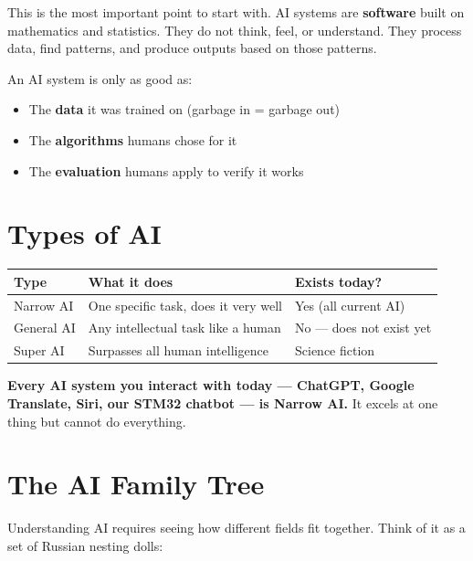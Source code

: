 \documentclass[11pt,a4paper]{report}
\begin{document}
This is the most important point to start with. AI systems are \textbf{software} built on mathematics and statistics. They do not think, feel, or understand. They process data, find patterns, and produce outputs based on those patterns.

An AI system is only as good as:
\begin{itemize}
    \item The \textbf{data} it was trained on (garbage in = garbage out)
    \item The \textbf{algorithms} humans chose for it
    \item The \textbf{evaluation} humans apply to verify it works
\end{itemize}

\section{Types of AI}

\begin{table}[h]
\centering
\begin{tabularx}{\textwidth}{l X X}
\toprule
\textbf{Type} & \textbf{What it does} & \textbf{Exists today?} \\
\midrule
Narrow AI & One specific task, does it very well & Yes (all current AI) \\
General AI & Any intellectual task like a human & No --- does not exist yet \\
Super AI & Surpasses all human intelligence & Science fiction \\
\bottomrule
\end{tabularx}
\end{table}

\textbf{Every AI system you interact with today --- ChatGPT, Google Translate, Siri, our STM32 chatbot --- is Narrow AI.} It excels at one thing but cannot do everything.

\section{The AI Family Tree}

Understanding AI requires seeing how different fields fit together. Think of it as a set of Russian nesting dolls:
\end{document}

